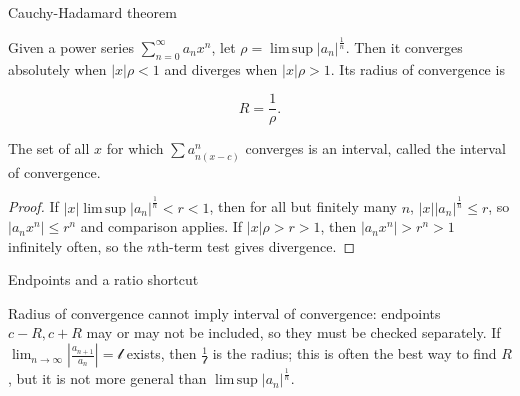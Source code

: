 \begin{theorem}{Cauchy-Hadamard theorem}

Given a power series \(\sum_{n = 0}^{\infty}a_{n}x^{n}\), let \(\rho = \operatorname{lim\, sup}\left| a_{n} \right|^{\frac{1}{n}}\). Then it converges absolutely when \(|x|\rho < 1\) and diverges when \(|x|\rho > 1\). Its radius of convergence is

\[R = \frac{1}{\rho}.\]

The set of all \(x\) for which \(\sum a_{n{({x - c})}}^{n}\) converges is an interval, called the interval of convergence.

\end{theorem}

\begin{proof}

If \(|x|\operatorname{lim\, sup}\left| a_{n} \right|^{\frac{1}{n}} < r < 1\), then for all but finitely many \(n\), \(|x|\left| a_{n} \right|^{\frac{1}{n}} \leq r\), so \(\left| {a_{n}x^{n}} \right| \leq r^{n}\) and comparison applies. If \(|x|\rho > r > 1\), then \(\left| {a_{n}x^{n}} \right| > r^{n} > 1\) infinitely often, so the \(n\)th-term test gives divergence.

\end{proof}

\begin{qlremark}{Endpoints and a ratio shortcut}

Radius of convergence cannot imply interval of convergence: endpoints \(c - R,c + R\) may or may not be included, so they must be checked separately. If \(\lim_{n\rightarrow\infty}\left| \frac{a_{n + 1}}{a_{n}} \right| = \mathcal{l}\) exists, then \(\frac{1}{\mathcal{l}}\) is the radius; this is often the best way to find \(R\), but it is not more general than \(\operatorname{lim\, sup}\left| a_{n} \right|^{\frac{1}{n}}\).

\end{qlremark}

